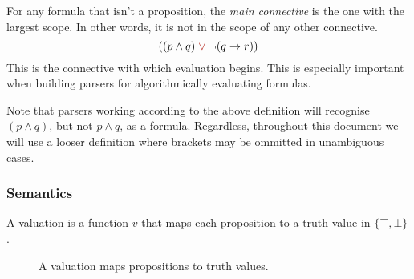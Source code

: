 For any formula that isn't a proposition, the \emph{main connective} is the one with the largest scope. In other words, it is not in the scope of any other connective.
%
\[((p \land q) \;{\color{BrickRed} \lor}\; \neg (q \rightarrow r))\]
%
This is the connective with which evaluation begins. This is especially important when building parsers for algorithmically evaluating formulas.

Note that parsers working according to the above definition will recognise \((p \land q)\), but not \(p \land q\), as a formula. Regardless, throughout this document we will use a looser definition where brackets may be ommitted in unambiguous cases.


\subsubsection{Semantics}

A valuation is a function \(v\) that maps each proposition to a truth value in \(\{\top, \bot\}\).
    
\begin{figure}[H]
    \centering
    \caption{A valuation maps propositions to truth values.}
    \label{fig:Ch01-valuation}
\end{figure}

